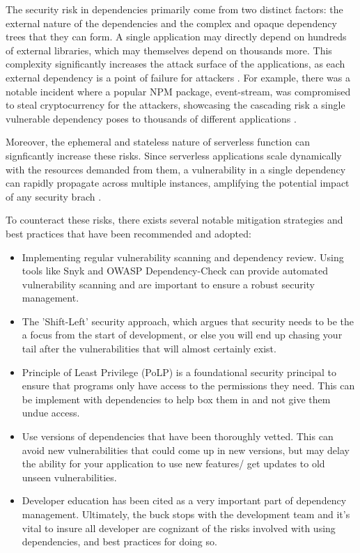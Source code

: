 \documentclass[12pt, letterpaper]{article}
\begin{document}
The security risk in dependencies primarily come from two distinct factors: the external nature of the dependencies and the complex and opaque dependency trees that they can form. A single application may directly depend on hundreds of external libraries, which may themselves depend on thousands more. This complexity significantly increases the attack surface of the applications, as each external dependency is a point of failure for attackers \cite{OWASP2021top}. For example, there was a notable incident where a popular NPM package, event-stream, was compromised to steal cryptocurrency for the attackers, showcasing the cascading risk a single vulnerable dependency poses to thousands of different applications \cite{fox2018open}.

Moreover, the ephemeral and stateless nature of serverless function can signficantly increase these risks. Since serverless applications scale dynamically with the resources demanded from them, a vulnerability in a single dependency can rapidly propagate across multiple instances, amplifying the potential impact of any security brach \cite{kavis2014cloud}.

To counteract these risks, there exists several notable mitigation strategies and best practices that have been recommended and adopted:

\begin{itemize}
	\item Implementing regular vulnerability scanning and dependency review. Using tools like Snyk and OWASP Dependency-Check can provide automated vulnerability scanning and are important to ensure a robust security management.
	\item The 'Shift-Left' security approach, which argues that security needs to be the a focus from the start of development, or else you will end up chasing your tail after the vulnerabilities that will almost certainly exist. 
	\item Principle of Least Privilege (PoLP) is a foundational security principal to ensure that programs only have access to the permissions they need. This can be implement with dependencies to help box them in and not give them undue access. 
	\item Use versions of dependencies that have been thoroughly vetted. This can avoid new vulnerabilities that could come up in new versions, but may delay the ability for your application to use new features/ get updates to old unseen vulnerabilities. 
	\item Developer education has been cited as a very important part of dependency management. Ultimately, the buck stops with the development team and it's vital to insure all developer are cognizant of the risks involved with using dependencies, and best practices for doing so. 
	
\end{itemize}
\end{document}

